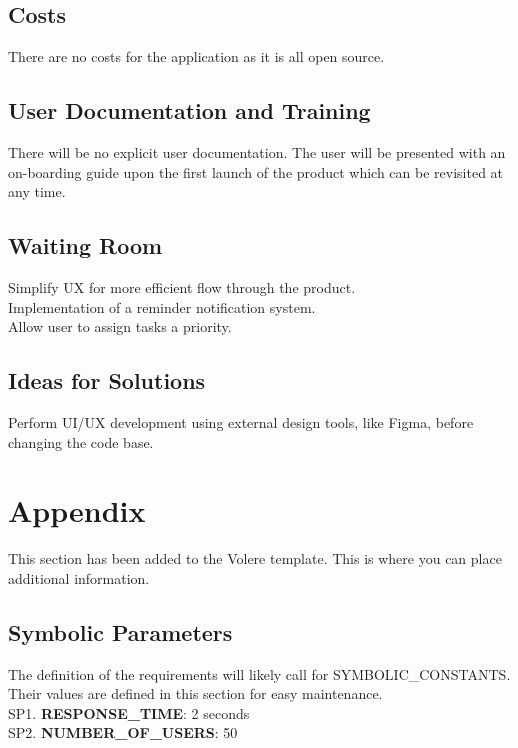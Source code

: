 \documentclass[12pt, titlepage]{article}
\begin{document}
\subsection{Costs}

There are no costs for the application as it is all open source.

\subsection{User Documentation and Training}

There will be no explicit user documentation. The user will be presented with an on-boarding guide upon the first launch of the product which can be revisited at any time. 

\subsection{Waiting Room}

Simplify UX for more efficient flow through the product.\\
Implementation of a reminder notification system. \\
Allow user to assign tasks a priority. 

\subsection{Ideas for Solutions}

Perform UI/UX development using external design tools, like Figma, before changing the code base. 





\newpage

\section{Appendix}

This section has been added to the Volere template.  This is where you can place
additional information.

\subsection{Symbolic Parameters}

The definition of the requirements will likely call for SYMBOLIC\_CONSTANTS.
Their values are defined in this section for easy maintenance.\\

\noindent SP1. \textbf{RESPONSE\_TIME}: 2 seconds \\
SP2. \textbf{NUMBER\_OF\_USERS}: 50
\end{document}
